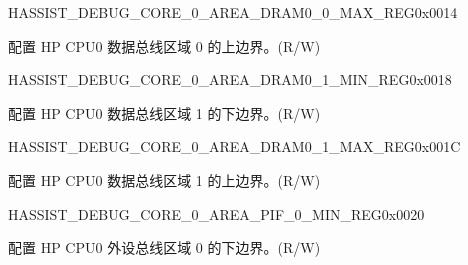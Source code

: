 \begin{register}{H}{ASSIST\_DEBUG\_CORE\_0\_AREA\_DRAM0\_0\_MAX\_REG}{0x0014}\label{regdesc:ASSISTDEBUGCORE0AREADRAM00MAXREG}
%
\regnewline%
\begin{regdesc}\begin{reglist}
\label{fielddesc:ASSISTDEBUGCORE0AREADRAM00MAX}\item [ASSIST\_DEBUG\_CORE\_0\_AREA\_DRAM0\_0\_MAX] 配置 HP CPU0 数据总线区域 0 的上边界。(R/W)
\end{reglist}\end{regdesc}
\end{register}


\begin{register}{H}{ASSIST\_DEBUG\_CORE\_0\_AREA\_DRAM0\_1\_MIN\_REG}{0x0018}\label{regdesc:ASSISTDEBUGCORE0AREADRAM01MINREG}
%
\regnewline%
\begin{regdesc}\begin{reglist}
\label{fielddesc:ASSISTDEBUGCORE0AREADRAM01MIN}\item [ASSIST\_DEBUG\_CORE\_0\_AREA\_DRAM0\_1\_MIN] 配置 HP CPU0 数据总线区域 1 的下边界。(R/W)
\end{reglist}\end{regdesc}
\end{register}

\begin{register}{H}{ASSIST\_DEBUG\_CORE\_0\_AREA\_DRAM0\_1\_MAX\_REG}{0x001C}\label{regdesc:ASSISTDEBUGCORE0AREADRAM01MAXREG}
%
\regnewline%
\begin{regdesc}\begin{reglist}
\label{fielddesc:ASSISTDEBUGCORE0AREADRAM01MAX}\item [ASSIST\_DEBUG\_CORE\_0\_AREA\_DRAM0\_1\_MAX] 配置 HP CPU0 数据总线区域 1 的上边界。(R/W)
\end{reglist}\end{regdesc}
\end{register}


\begin{register}{H}{ASSIST\_DEBUG\_CORE\_0\_AREA\_PIF\_0\_MIN\_REG}{0x0020}\label{regdesc:ASSISTDEBUGCORE0AREAPIF0MINREG}
%
\regnewline%
\begin{regdesc}\begin{reglist}
\label{fielddesc:ASSISTDEBUGCORE0AREAPIF0MIN}\item [ASSIST\_DEBUG\_CORE\_0\_AREA\_PIF\_0\_MIN] 配置 HP CPU0 外设总线区域 0 的下边界。(R/W)
\end{reglist}\end{regdesc}
\end{register}


